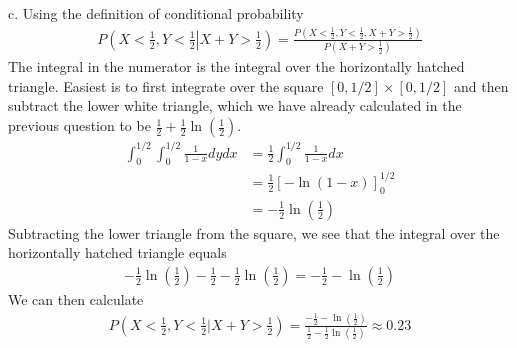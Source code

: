 \begin{exercise}
\begin{solution}
c.         Using the definition of conditional probability
        \begin{align*}
            P\left(X<\frac{1}{2},Y<\frac{1}{2}\left|X+Y>\frac{1}{2}\right.\right) = \frac{P\left(X<\frac{1}{2},Y<\frac{1}{2},X+Y>\frac{1}{2}\right)}{P\left(X+Y>\frac{1}{2}\right)}
        \end{align*}
        The integral in the numerator is the integral over the horizontally hatched triangle. Easiest is to first integrate over the square $[0,1/2]\times[0,1/2]$ and then subtract the lower white triangle, which we have already calculated in the previous question to be $\frac{1}{2}+\frac{1}{2}\ln\left(\frac{1}{2}\right)$.
        \begin{align*}
            \int_{0}^{1/2}\int_{0}^{1/2}\frac{1}{1-x}dydx & = \frac{1}{2}\int_{0}^{1/2}\frac{1}{1-x}dx\\
            & = \frac{1}{2}\left[-\ln(1-x)\right]^{1/2}_{0}\\
            & = -\frac{1}{2}\ln\left(\frac{1}{2}\right)
        \end{align*}
        Subtracting the lower triangle from the square, we see that the integral over the horizontally hatched triangle equals
        \begin{align*}
            -\frac{1}{2}\ln\left(\frac{1}{2}\right) - \frac{1}{2}-\frac{1}{2}\ln\left(\frac{1}{2}\right)=-\frac{1}{2}-\ln\left(\frac{1}{2}\right)
        \end{align*}
        We can then calculate
        \begin{align*}
            P\left(X<\frac{1}{2},Y<\frac{1}{2}|X+Y>\frac{1}{2}\right)=\frac{-\frac{1}{2}-\ln\left(\frac{1}{2}\right)}{\frac{1}{2}-\frac{1}{2}\ln\left(\frac{1}{2}\right)}\approx 0.23
        \end{align*}
\end{solution}
\end{exercise}


